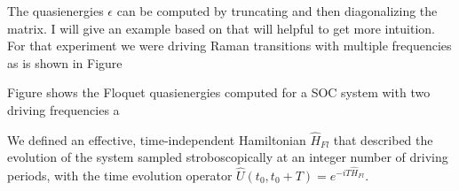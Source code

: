 The quasienergies $\epsilon$ can be computed by truncating and then diagonalizing the matrix. I will give an example based on \cite{campbell_magnetic_2016} that will helpful to get more intuition. For that experiment we were driving Raman transitions with multiple frequencies as is shown in Figure

Figure  shows the Floquet quasienergies computed for a SOC system with two driving frequencies a


We defined an effective, time-independent Hamiltonian $\hat{H}_{Fl}$ that described the evolution of the system sampled stroboscopically at an integer number of driving periods, with the time evolution operator $\hat{U}(t_0,t_0+T)=e^{-iT\hat{H}_{Fl}}$.
%
%





